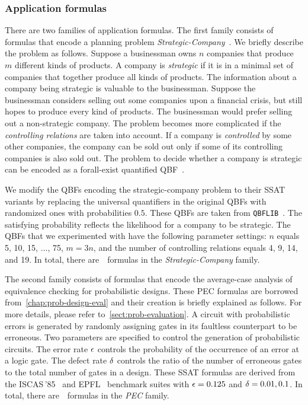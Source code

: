\subsubsection{Application formulas}
There are two families of application formulas.
The first family consists of formulas that encode a planning problem
\textit{Strategic-Company}~\cite{Cadoli1997}.
We briefly describe the problem as follows.
Suppose a businessman owns $n$ companies that produce $m$ different kinds of products.
A company is \textit{strategic} if it is in a minimal set of companies that together produce all kinds of products.
The information about a company being strategic is valuable to the businessman.
Suppose the businessman considers selling out some companies upon a financial crisis,
but still hopes to produce every kind of products.
The businessman would prefer selling out a non-strategic company.
The problem becomes more complicated if the \textit{controlling relations} are taken into account.
If a company is \textit{controlled} by some other companies,
the company can be sold out only if some of its controlling companies is also sold out.
The problem to decide whether a company is strategic can be encoded as a forall-exist quantified QBF~\cite{Faber2005,Leone2006}.

We modify the QBFs encoding the strategic-company problem
to their SSAT variants by replacing the universal quantifiers in the original QBFs
with randomized ones with probabilities $0.5$.
These QBFs are taken from \texttt{QBFLIB}~\cite{Narizzano2006}.
The satisfying probability reflects the likelihood for a company to be strategic.
The QBFs that we experimented with have the following parameter settings:
$n$ equals 5, 10, 15, $\ldots$, 75, $m=3n$,
and the number of controlling relations equals 4, 9, 14, and 19.
In total, there are~\nstrategic~formulas in the \textit{Strategic-Company} family.

The second family consists of formulas that encode
the average-case analysis of equivalence checking for probabilistic designs.
These PEC formulas are borrowed from~\cref{chap:prob-design-eval} and
their creation is briefly explained as follows.
For more details, please refer to~\cref{sect:prob-evaluation}.
A circuit with probabilistic errors is generated by
randomly assigning gates in its faultless counterpart to be erroneous.
Two parameters are specified to control the generation of probabilistic circuits.
The error rate $\epsilon$ controls the probability of the occurrence of an error at a logic gate.
The defect rate $\delta$ controls the ratio of the number of erroneous gates to the total number of gates in a design.
These SSAT formulas are derived from the ISCAS\,'85~\cite{ISCAS85-benchmark}
and EPFL~\cite{EPFL-benchmark} benchmark suites with $\epsilon=0.125$ and $\delta=0.01,0.1$.
In total, there are~\npec~formulas in the \textit{PEC} family.


